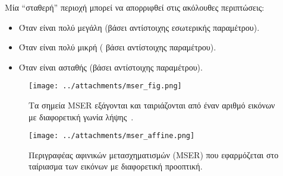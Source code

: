 \newpage
  


 Μία ``σταθερή'' περιοχή μπορεί να απορριφθεί στις ακόλουθες περιπτώσεις:
  
  \begin{itemize}
  \item Όταν είναι πολύ μεγάλη (βάσει αντίστοιχης εσωτερικής παραμέτρου).
  \item Όταν είναι πολύ μικρή ( βάσει αντίστοιχης παραμέτρου).
  \item Όταν είναι ασταθής (βάσει αντίστοιχης παραμέτρου).
  
  \end{itemize}

 
 

\begin{figure}[!ht]
\centering
\begin{minipage}[b]{0.3\linewidth}
\texttt{[image: ../attachments/mser\_fig.png]}
\end{minipage}
\caption{Τα σημεία MSER εξάγονται και ταιριάζονται από έναν αριθμό εικόνων με διαφορετική γωνία λήψης~\cite{mikolajczyk2004scale}.}
\label{fig:mser_affine1}
\end{figure}

\begin{figure}[!ht]
\centering
\begin{minipage}[b]{0.6\linewidth}
\texttt{[image: ../attachments/mser\_affine.png]}
\end{minipage}
\caption{Περιγραφέας αφινικών μετασχηματισμών (MSER) που εφαρμόζεται στο ταίριασμα των εικόνων με διαφορετική προοπτική.}
\label{fig:mser_affine2}
\end{figure}  
 

% 
%   

